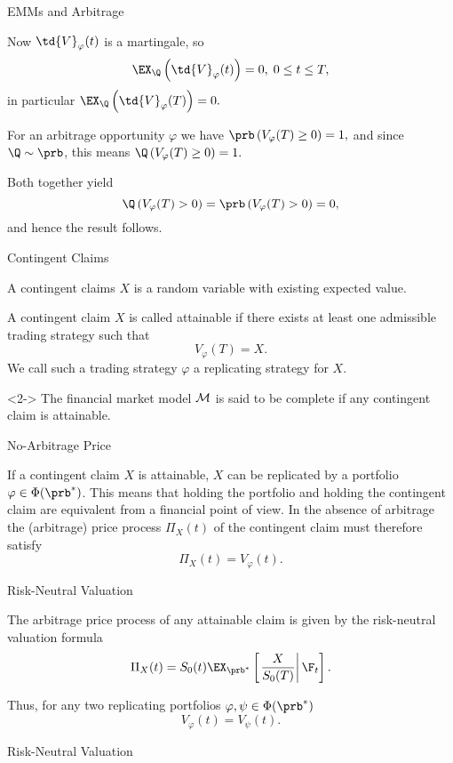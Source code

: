 { EMMs and Arbitrage}

Now $\td{V}_\varphi(t)$ is a martingale, so
$$
\EX_{\Q}\left(\td{V}_\varphi(t)\right) = 0,\; 0 \leq t \leq T,
$$
in particular $ \EX_{\Q}\left(\td{V}_\varphi(T)\right) = 0. $

For an arbitrage opportunity $\varphi$ we have $
\prb\left(V_\varphi(T) \geq 0\right) =1, $ and since $\Q \sim
\prb$, this means $ \Q\left(V_\varphi(T) \geq 0\right) =1. $

Both together yield
$$
\Q\left(V_\varphi(T) > 0\right) = \prb\left(V_\varphi(T) >
0\right) =0,
$$
and hence the result follows.\hfill \eb

{ Contingent Claims}

A contingent claims $X$ is a random variable with existing expected value.






	A contingent claim $X$ is called attainable if there
exists at least one admissible trading strategy such that
$$
V_\varphi(T) = X.
$$
We call such a  trading strategy $\varphi$ a replicating strategy
for $X$.

	<2-> The financial market model ${\cal M}$ is said
to be complete if any contingent claim is attainable.






{ No-Arbitrage Price}

If a contingent claim $X$ is attainable, $X$ can be replicated by
a portfolio $\varphi \in \Phi(\prb^*)$. This means that holding
the portfolio and holding the contingent claim are equivalent from
a financial point of view. In the absence of arbitrage the
(arbitrage) price process $\Pi_X(t)$ of the contingent claim must
therefore satisfy
$$
\Pi_X(t) = V_\varphi(t).
$$

{ Risk-Neutral Valuation}

The arbitrage price process of
any attainable claim is given by the risk-neutral valuation
formula
$$
\Pi_X(t) = S_0(t)
\EX_{\prb^*}\left[\left.\frac{X}{S_0(T)}\right|\F_t\right].
$$

Thus, for any two replicating portfolios $\varphi, \psi \in
\Phi(\prb^*)$
$$
V_\varphi(t) = V_\psi(t).
$$

{ Risk-Neutral Valuation}


